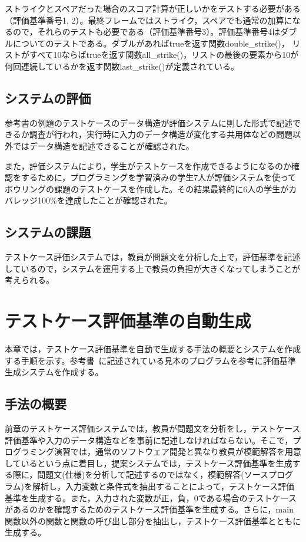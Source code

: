 \documentclass{tpu-sotu}
\begin{document}
ストライクとスペアだった場合のスコア計算が正しいかをテストする必要がある（評価基準番号1, 2）。最終フレームではストライク，スペアでも通常の加算になるので，それらのテストも必要である（評価基準番号3）。評価基準番号4はダブルについてのテストである。ダブルがあればtrueを返す関数double\_strike()， リストがすべて10ならばtrueを返す関数all\_strike()，リストの最後の要素から10が何回連続しているかを返す関数last\_strike()が定義されている。
\section{システムの評価}
参考書の例題のテストケースのデータ構造が評価システムに則した形式で記述できるか調査が行われ，実行時に入力のデータ構造が変化する共用体などの問題以外ではデータ構造を記述できることが確認された。

また，評価システムにより，学生がテストケースを作成できるようになるのか確認をするために，プログラミングを学習済みの学生7人が評価システムを使ってボウリングの課題のテストケースを作成した。その結果最終的に6人の学生がカバレッジ100\%を達成したことが確認された。

\section{システムの課題}
テストケース評価システムでは，教員が問題文を分析した上で，評価基準を記述しているので，システムを運用する上で教員の負担が大きくなってしまうことが考えられる。

\chapter{テストケース評価基準の自動生成}
本章では，テストケース評価基準を自動で生成する手法の概要とシステムを作成する手順を示す。参考書~\cite{b1}に記述されている見本のプログラムを参考に評価基準生成システムを作成する。

\section{手法の概要}
前章のテストケース評価システムでは，教員が問題文を分析をし，テストケース評価基準や入力のデータ構造などを事前に記述しなければならない。そこで，プログラミング演習では，通常のソフトウェア開発と異なり教員が模範解答を用意しているという点に着目し，提案システムでは，テストケース評価基準を生成する際に，問題文(仕様)を分析して記述するのではなく，模範解答(ソースプログラム)を解析し，入力変数と条件式を抽出することによって，テストケース評価基準を生成する。また，入力された変数が正，負，0である場合のテストケースがあるのかを確認するためのテストケース評価基準を生成する。さらに，main関数以外の関数と関数の呼び出し部分を抽出し，テストケース評価基準とともに生成する。
\end{document}

